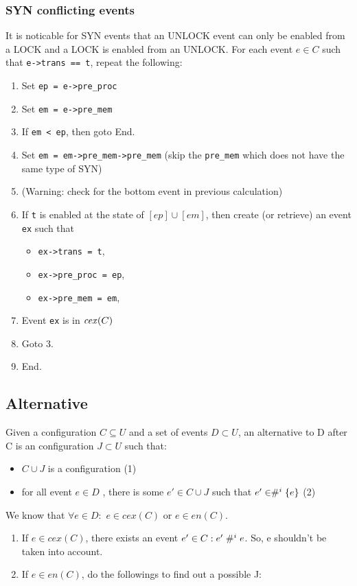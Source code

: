\documentclass{llncs}
\begin{document}
\subsubsection{SYN conflicting events}
\label{ss:cex_syn}
\noindent
It is noticable for SYN events that an UNLOCK event can only be enabled from a LOCK and a LOCK is enabled from an UNLOCK.
For each event $e \in C$ such that \verb!e->trans == t!, repeat the following:
\begin{enumerate}
\item Set \verb!ep = e->pre_proc!
\item Set \verb!em = e->pre_mem!
\item If  \verb!em < ep!, then goto End.
\item Set \verb!em = em->pre_mem->pre_mem! (skip the \verb!pre_mem! which does not have the same type of SYN)
\item (Warning: check for the bottom event in previous calculation)
\item
  If \verb!t! is enabled at the state of $[ep] \cup [em]$, then create (or retrieve) an event \verb!ex! such that
  \begin{itemize}
  \item \verb!ex->trans = t!,
  \item \verb!ex->pre_proc = ep!,
  \item \verb!ex->pre_mem = em!,
  \end{itemize}
\item Event \verb!ex! is in $\mathop{\mathit{cex}} (C)$
\item Goto 3.
\item End.
\end{enumerate}

\subsection{Alternative}
\noindent
Given a configuration $C \subseteq U$ and a set of events $D \subset U$, an alternative to D after C is an configuration $J \subset U $ such that:
\begin{itemize}
\item 
	$C \cup J$ is a configuration 						(1)
\item
	for all event $e \in D$ , there is some $e'\in C \cup J$ such that $e' \in  \mathrel{\#^i_{}}\{e\}$ 	(2)
\end{itemize}



\noindent
We know that $\forall e \in D: $ $e \in cex(C)$ or $e \in en(C)$.
\begin{enumerate}
\item
	If  $e \in cex(C)$, there exists an event $e' \in C: e' \mathrel{\#^i_{}} e$. So, e shouldn't be taken into account.
\item
	If $e \in en(C)$, do the followings to find out a possible J:
\end{enumerate}
\end{document}
